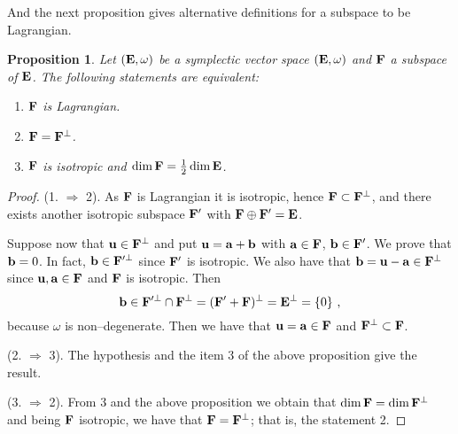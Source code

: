 \documentclass[12pt]{report}
\newtheorem{prop}[teor]{Proposition}
\begin{document}
And the next proposition gives alternative definitions for a subspace to be Lagrangian.

\begin{prop}
Let $({\bf E},\omega)$ be a symplectic vector space $({\bf E},\omega)$ and ${\bf F}$ a subspace of ${\bf E}$. The following statements are equivalent:
\begin{enumerate}
\item ${\bf F}$ is Lagrangian.
\item ${\bf F}={\bf F}^\bot$.
\item ${\bf F}$ is isotropic and $\dim{\bf F} =\frac{1}{2} \dim{\bf E}$.
\end{enumerate}
\end{prop}
\begin{proof} 
(1. $\Longrightarrow$  2).
As ${\bf F}$ is  Lagrangian it is isotropic, hence ${\bf F}\subset{\bf F}^\bot$, and there exists another isotropic subspace ${\bf F}'$ with ${\bf F}\oplus{\bf F}'={\bf E}$.

Suppose now that ${\bf u}\in{\bf F}^\bot$ and put ${\bf u}={\bf a}+{\bf b}$ with ${\bf a}\in{\bf F}$, ${\bf b}\in{\bf F}'$. We prove that ${\bf b}=0$. In fact, ${\bf b}\in{\bf F}'^{\bot}$ since ${\bf F}'$ is isotropic. We also have that ${\bf b}={\bf u}-{\bf a}\in{\bf F}^\bot$ since  ${\bf u},{\bf a}\in{\bf F}$ and ${\bf F}$ is isotropic. Then 
$$
{\bf b}\in{\bf F}'^{\bot}\cap{\bf F}^\bot=({\bf F}'+{\bf F})^\bot={\bf E}^\bot=\{0\}\ ,
$$
because $\omega$ is non--degenerate. Then we have that ${\bf u}={\bf a}\in{\bf F}$ and 
${\bf F}^\bot\subset{\bf F}$.

(2. $\Longrightarrow$  3).
The hypothesis and the item 3 of the above proposition give the result.

(3. $\Longrightarrow$  2).
From 3 and the above proposition we obtain that $\dim{\bf F}=\dim{\bf F}^\bot$ and being ${\bf F}$ isotropic, we have that ${\bf F}={\bf F}^\bot$; that is,
the statement 2.


\end{proof}
\end{document}
